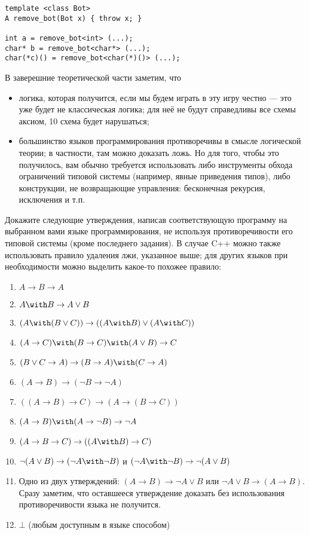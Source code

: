 \documentclass[10pt,a4paper,oneside]{article}
\begin{document}
\begin{enumerate}
\begin{verbatim}
template <class Bot>
A remove_bot(Bot x) { throw x; }

int a = remove_bot<int> (...);
char* b = remove_bot<char*> (...);
char(*c)() = remove_bot<char(*)()> (...);
\end{verbatim}

В заверешние теоретической части заметим, что 
\begin{itemize}
\item логика, которая получится, если мы будем играть в эту игру честно --- это уже будет не классическая логика; для неё не будут справедливы все
схемы аксиом, 10 схема будет нарушаться;
\item большинство языков программирования противоречивы в смысле логической теории; в частности, там можно доказать ложь.
Но для того, чтобы это получилось, вам обычно требуется использовать либо инструменты обхода ограничений типовой системы
(например, явные приведения типов), либо конструкции, не возвращающие управления: бесконечная рекурсия, исключения и т.п.
\end{itemize}

Докажите следующие утверждения, написав соответствующую программу на выбранном вами языке программирования,
не используя противоречивости его типовой системы (кроме последнего задания). В случае C++ можно также
использовать правило удаления лжи, указанное выше; для других языков при необходимости можно выделить какое-то похожее правило:
\begin{enumerate}
\item $A \rightarrow B \rightarrow A$
\item $A \with B \rightarrow A \vee B$
\item $(A \with (B \vee C)) \rightarrow ((A \with B) \vee (A \with C))$
\item $(A \rightarrow C) \with (B \rightarrow C) \with (A \vee B) \rightarrow C$
\item $(B \vee C \rightarrow A) \rightarrow (B \rightarrow A) \with (C \rightarrow A)$
\item $(A \rightarrow B) \rightarrow (\neg B \rightarrow \neg A)$
\item $((A \rightarrow B) \rightarrow C) \rightarrow (A \rightarrow (B \rightarrow C))$
\item $(A \rightarrow B) \with (A \rightarrow \neg B) \rightarrow \neg A$
\item $(A \rightarrow B \rightarrow C) \rightarrow ((A \with B) \rightarrow C)$
\item $\neg (A \vee B) \rightarrow (\neg A \with \neg B)$ и $(\neg A \with \neg B) \rightarrow \neg (A \vee B)$
\item Одно из двух утверждений: $(A \rightarrow B) \rightarrow \neg A \vee B$ или
$\neg A \vee B \rightarrow (A \rightarrow B)$. Сразу заметим, что оставшееся утверждение доказать
без использования противоречивости языка не получится.
\item $\bot$ (любым доступным в языке способом)
\end{enumerate}


\end{enumerate}
\end{document}
